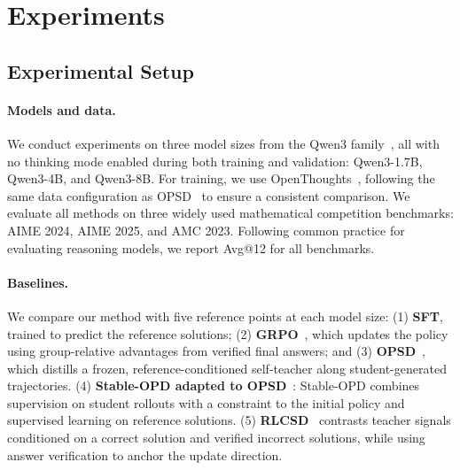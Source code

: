 \documentclass{article} %
\begin{document}
\section{Experiments}

\subsection{Experimental Setup}
\label{sec:experimental-setup}
\paragraph{Models and data.} We conduct experiments on three model sizes from the Qwen3 family~\citep{qwen3}, all with no thinking mode enabled during both training and validation: Qwen3-1.7B, Qwen3-4B, and Qwen3-8B. For training, we use OpenThoughts~\citep{guha2025openthoughtsdatarecipesreasoning}, following the same data configuration as OPSD~\citep{opsd} to ensure a consistent comparison. We evaluate all methods on three widely used mathematical competition benchmarks: AIME 2024, AIME 2025, and AMC 2023. Following common practice for evaluating reasoning models, we report Avg@12 for all benchmarks.

\paragraph{Baselines.} We compare our method with five reference points at each model size: (1) \textbf{SFT}, trained to predict the reference solutions; (2) \textbf{GRPO}~\citep{shao2024deepseekmathpushinglimitsmathematical}, which updates the policy using group-relative advantages from verified final answers; and (3) \textbf{OPSD}~\citep{opsd}, which distills a frozen, reference-conditioned self-teacher along student-generated trajectories. (4) \textbf{Stable-OPD adapted to OPSD}~\citep{stableopd}: Stable-OPD combines supervision on student rollouts with a constraint to the initial policy and supervised learning on reference solutions. (5) \textbf{RLCSD}~\citep{rlcsd} contrasts teacher signals conditioned on a correct solution and verified incorrect solutions, while using answer verification to anchor the update direction. 
\end{document}
